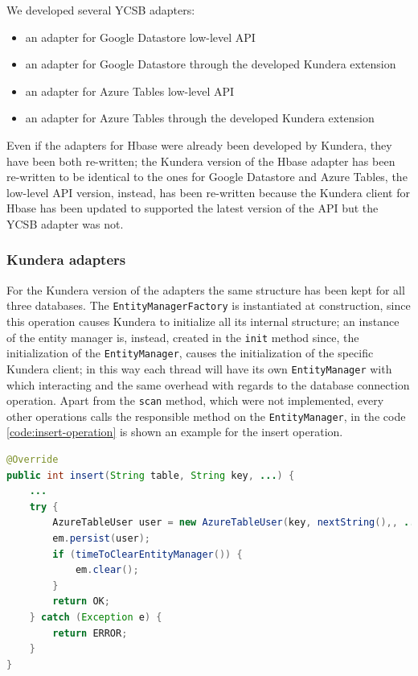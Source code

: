 \newparagraph We developed  several YCSB adapters:
\begin{itemize}
\item an adapter for Google Datastore low-level API
\item an adapter for Google Datastore through the developed Kundera extension
\item an adapter for Azure Tables low-level API
\item an adapter for Azure Tables through the developed Kundera extension
\end{itemize}
\noindent Even if the adapters for Hbase were already been developed by Kundera, they have been both re-written; the Kundera version of the Hbase adapter has been re-written to be identical to the ones for Google Datastore and Azure Tables, the low-level API version, instead, has been re-written because the Kundera client for Hbase has been updated to supported the latest version of the API but the YCSB adapter was not.

\subsubsection{Kundera adapters}
For the Kundera version of the adapters the same structure has been kept for all three databases. The \texttt{EntityManagerFactory} is instantiated at construction, since this operation causes Kundera to initialize all its internal structure; an instance of the entity manager is, instead, created in the \texttt{init} method since, the initialization of the \texttt{EntityManager}, causes the initialization of the specific Kundera client; in this way each thread will have its own \texttt{EntityManager} with which interacting and the same overhead with regards to the database connection operation.
Apart from the \texttt{scan} method, which were not implemented, every other operations calls the responsible method on the \texttt{EntityManager}, in the code \ref{code:insert-operation} is shown an example for the insert operation.

\begin{lstlisting}[language=Java, caption=Insert operation of the Azure Tables adapter, label=code:insert-operation]
@Override
public int insert(String table, String key, ...) {
    ...
    try {
        AzureTableUser user = new AzureTableUser(key, nextString(),, ...);
        em.persist(user);
        if (timeToClearEntityManager()) {
            em.clear();
        }
        return OK;
    } catch (Exception e) {
        return ERROR;
    }
}
\end{lstlisting}

